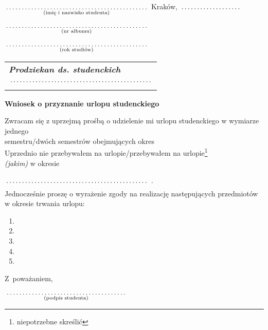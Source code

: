 \documentclass[a4paper,11pt]{article}
\newcommand{\fillField}[2]{
    $\underset{\text{#1}}{\parbox[t]{#2}{\dotfill}}$
}
\begin{document}
\noindent
\fillField{(imię i nazwisko studenta)}{7cm} \hfill Kraków, \fillField{}{3cm}\\\\
\fillField{(nr albumu)}{7cm} \\\\
\fillField{(rok studiów)}{7cm} \\


\phantom{a}\hfill
\begin{tabular}[c]{@{}l@{}}
\textit{\textbf{Prodziekan ds. studenckich}} \\\\
\fillField{}{7cm}
\end{tabular}

\vskip 1.5cm

\begin{center}
{\Large \textbf{Wniosek o przyznanie urlopu studenckiego}}
\end{center}

\vskip 0.5cm

\noindent
Zwracam się z uprzejmą prośbą o udzielenie mi urlopu studenckiego w wymiarze
jednego \\semestru/dwóch semestrów obejmujących okres \dotfill\\
Uprzednio nie przebywałem na
urlopie/przebywałem na urlopie\footnote[1]{niepotrzebne skreślić}
\dotfill \\\textit{(jakim)} w okresie
\fillField{}{7cm}.\\

\noindent
Jednocześnie proszę o wyrażenie zgody na realizację następujących przedmiotów
w okresie trwania urlopu:
    \begin{enumerate}
        \item \dotfill
        \item \dotfill
        \item \dotfill
        \item \dotfill
        \item \dotfill
    \end{enumerate}

\vskip 1.3cm

\hspace{\fill} Z~poważaniem, \hspace{3cm} \\\\
\null\hfill \fillField{(podpis studenta)}{6cm} %
\vskip 1.0cm
\end{document}
